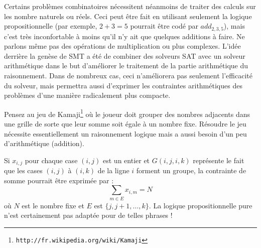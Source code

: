 
Certains probl\`emes combinatoires n\'ecessitent n\'eanmoins de traiter des calculs sur les nombre naturels ou r\'eels. Ceci peut \^etre fait en utilisant seulement la logique propositionnelle (par exemple, $2+3=5$ pourrait \^etre cod\'e par $add_{2,3,5}$), mais c'est tr\`es inconfortable \`a moins qu'il n'y ait que quelques additions \`a faire. Ne parlons m\^eme pas des op\'erations de multiplication ou plus complexes. L'id\'ee derri\`ere la gen\`ese de SMT a \'et\'e de combiner des solveurs SAT avec un solveur arithm\'etique dans le but d'am\'eliorer le traitement de la partie arithm\'etique du raisonnement. Dans de nombreux cas, ceci n'am\'eliorera pas seulement l'efficacit\'e du solveur, mais permettra aussi d'exprimer les contraintes arithm\'etiques des probl\`emes d'une mani\`ere radicalement plus compacte.

Pensez au jeu de Kamaji\footnote{\texttt{http://fr.wikipedia.org/wiki/Kamaji}}  o\`u le joueur doit grouper des nombres adjacents dans une grille de sorte que leur somme soit \'egale \`a un nombre fixe. R\'esoudre le jeu n\'ecessite essentiellement un raisonnement logique mais a aussi besoin d'un peu d'arithm\'etique (addition).


Si $x_{i,j}$ pour chaque case $(i,j)$ est un entier et $G(i,j,i,k)$ repr\'esente le fait que les cases $(i,j)$ \`a $(i,k)$ de la ligne $i$ forment un groupe, la contrainte de somme pourrait \^etre exprim\'ee par :
$$\sum_{m\in E}x_{i,m}=N$$
o\`u $N$ est le nombre fixe et $E$ est $\{j,j+1,\ldots,k\}$. La logique propositionnelle pure n'est certainement pas adapt\'ee pour de telles phrases !